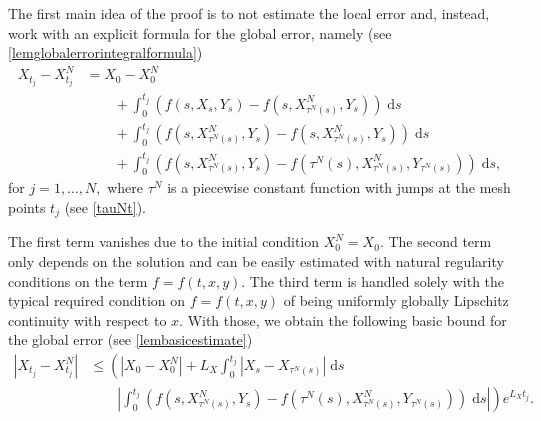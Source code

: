 \documentclass[reqno,12pt]{amsart}
\theoremstyle{plain}%
\theoremstyle{definition}
\begin{document}
The first main idea of the proof is to not estimate the local error and, instead, work with an explicit formula for the global error, namely (see \cref{lemglobalerrorintegralformula})
\begin{equation}
    \label{lemglobalerrorintegralformulaintro}
    \begin{aligned}
        X_{t_j} - X_{t_j}^N & = X_0 - X_0^N \\
        & \qquad + \int_0^{t_j} \left( f(s, X_s, Y_s) - f(s, X_{\tau^N(s)}^N, Y_s) \right)\;\mathrm{d}s  \\ 
        & \qquad + \int_{0}^{t_j} \left( f(s, X_{\tau^N(s)}^N, Y_s) - f(s, X_{\tau^N(s)}^N, Y_s) \right)\;\mathrm{d}s \\
        & \qquad + \int_0^{t_j} \left( f(s, X_{\tau^N(s)}^N, Y_s) - f(\tau^N(s), X_{\tau^N(s)}^N, Y_{\tau^N(s)}) \right)\;\mathrm{d}s,
    \end{aligned}
\end{equation}
for $j = 1, \ldots, N,$ where $\tau^N$ is a piecewise constant function with jumps at the mesh points $t_j$ (see \cref{tauNt}).

The first term vanishes due to the initial condition $X_0^N = X_0$. The second term only depends on the solution and can be easily estimated with natural regularity conditions on the term $f=f(t, x, y)$. The third term is handled solely with the typical required condition on $f=f(t, x, y)$ of being uniformly globally Lipschitz continuity with respect to $x$. With those, we obtain the following basic bound for the global error (see \cref{lembasicestimate})
\begin{equation}
    \label{Etjbasicboundintro}
    \begin{aligned}
        |X_{t_j} - X_{t_j}^N| & \leq \left( |X_0 - X_0^N| + L_X \int_0^{t_j} |X_s - X_{\tau^N(s)}| \;\mathrm{d}s \right. \\
        & \qquad \left. \left|\int_0^{t_j} \left( f(s, X_{\tau^N(s)}^N, Y_s) - f(\tau^N(s), X_{\tau^N(s)}^N, Y_{\tau^N(s)}) \right)\;\mathrm{d}s\right|\right) e^{L_X t_j}.
    \end{aligned}
\end{equation}
\end{document}
